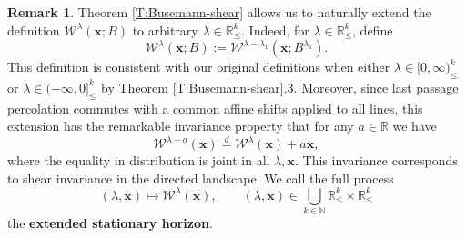 \documentclass[11pt]{article}
\newcommand{\N}{\mathbb{N}}
\newcommand{\R}{\mathbb{R}}
\newcommand{\la}{\lambda}
\newcommand{\cW}{\mathcal{W}}
\newcommand{\eqd}{\stackrel{d}{=}}
\newcommand{\bx}{\mathbf{x}}
\theoremstyle{definition} %
\newtheorem{remark}[theorem]{Remark}
\theoremstyle{remark} %
\begin{document}
\begin{remark}
	\label{R:full-multi-path-Busemanns}
	Theorem \ref{T:Busemann-shear} allows us to naturally extend the definition $\cW^\la(\bx; B)$ to arbitrary $\la \in \R^k_\le$. Indeed, for $\la \in \R^k_\le$, define
	$$
	\cW^\la(\bx; B) := \cW^{\la - \la_1}(\bx; B^{\la_1}).
	$$
This definition is consistent with our original definitions when either $\la \in [0, \infty)^k_\le$ or $\la \in (-\infty, 0]^k_\le$ by Theorem \ref{T:Busemann-shear}.3. Moreover, since last passage percolation commutes with a common affine shifts applied to all lines, this extension has the remarkable invariance property that for any $a \in \R$ we have
	$$
	\cW^{\la + a}(\bx) \eqd \cW^{\la}(\bx) + a \bx,
	$$
	where the equality in distribution is joint in all $\la, \bx$. This invariance corresponds to shear invariance in the directed landscape. We call the full process
	$$
	(\la, \bx) \mapsto \cW^\la(\bx), \qquad (\la, \bx) \in \bigcup_{k \in \N} \R^k_\le \times \R^k_\le
	$$
	the \textbf{extended stationary horizon}. 
\end{remark}
\end{document}

